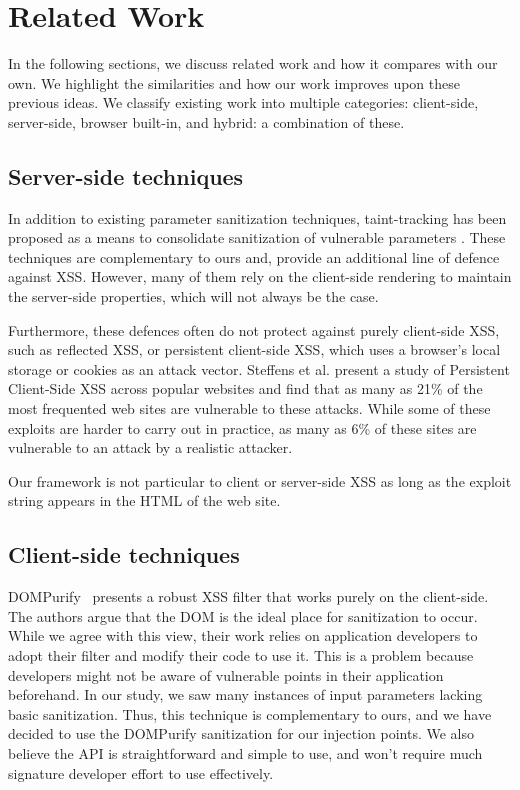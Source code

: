 \section{Related Work}
In the following sections, we discuss related work and how it compares with our own. We highlight the similarities and how our work improves upon these previous ideas. We classify existing work into multiple categories: client-side, server-side, browser built-in, and hybrid: a combination of these.

\subsection{Server-side techniques} In addition to existing parameter sanitization techniques, taint-tracking has been proposed as a means to consolidate sanitization of vulnerable parameters \cite{Xu:2006:TPE:1267336.1267345,DBLP:conf/sec/Nguyen-TuongGGSE05,Pietraszek:2005:DAI:2146257.2146267,Bisht:2008:XPD:1428322.1428325}. These techniques are complementary to ours and, provide an additional line of defence against \ac{XSS}. However, many of them rely on the client-side rendering to maintain the server-side properties, which will not always be the case.

Furthermore, these defences often do not protect against purely client-side \ac{XSS}, such as reflected \ac{XSS}, or persistent client-side \ac{XSS}, which uses a browser's local storage or cookies as an attack vector. Steffens et al. \cite{DBLP:conf/ndss/SteffensRJS19} present a study of Persistent Client-Side \ac{XSS} across popular websites and find that as many as 21\% of the most frequented web sites are vulnerable to these attacks.  While some of these exploits are harder to carry out in practice, as many as 6\% of these sites are vulnerable to an attack by a realistic attacker.

Our framework is not particular to client or server-side \ac{XSS} as long as the exploit string appears in the HTML of the web site.

\subsection{Client-side techniques} 

DOMPurify~\cite{10.1007/978-3-319-66399-9_7} presents a robust \ac{XSS} filter that works purely on the client-side. The authors argue that the DOM is the ideal place for sanitization to occur. While we agree with this view, their work relies on application developers to adopt their filter and modify their code to use it. This is a problem because developers might not be aware of vulnerable points in their application beforehand. In our study, we saw many instances of input parameters lacking basic sanitization. Thus, this technique is complementary to ours, and we have decided to use the DOMPurify sanitization for our injection points. We also believe the API is straightforward and simple to use, and won't require much signature developer effort to use effectively.

